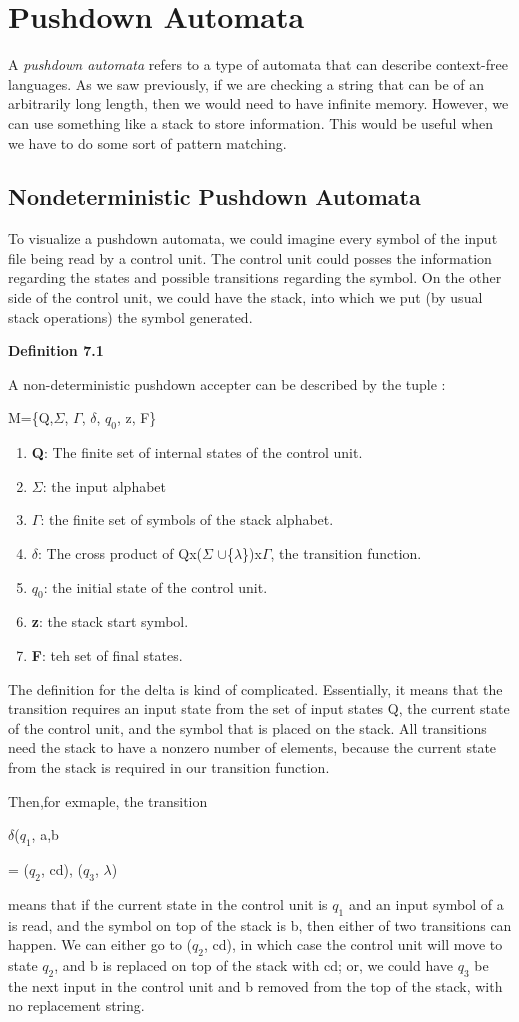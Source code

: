 \documentclass{article}
\begin{document}
\section{Pushdown Automata}
A \textit{pushdown automata} refers to a type of automata that can describe context-free languages. As we saw previously, if we 
are checking a string that can be of an arbitrarily long length, then we would need to have infinite memory. However, we can use 
something like a stack to store information. This would be useful when we have to do some sort of pattern matching.
\subsection{Nondeterministic Pushdown Automata}
To visualize a pushdown automata, we could imagine every symbol of the input file being read by a control unit. The control 
unit could posses the information regarding the states and possible transitions regarding the symbol. On the other side of the
control unit, we could have the stack, into which we put (by usual stack operations) the symbol generated.

\centerline{\textbf{Definition 7.1}}

A non-deterministic pushdown accepter can be described by the tuple :

\centerline{M=\{Q,$\Sigma$, $\Gamma$, $\delta$, $q_0$, z, F\}}

\begin{enumerate}
		\item{\textbf{Q}}: The finite set of internal states of the control unit.
		\item{\textbf{$\Sigma$}}: the input alphabet
		\item{\textbf{$\Gamma$}}: the finite set of symbols of the stack alphabet. 
		\item{\textbf{$\delta$}}: The cross product of Qx($\Sigma$ $\cup$\{$\lambda$\})x$\Gamma$, the transition function.
		\item{\textbf{$q_0$}}: the initial state of the control unit.
		\item{\textbf{z}}: the stack start symbol.
		\item{\textbf{F}}: teh set of final states.
\end{enumerate}
The definition for the delta is kind of complicated. Essentially, it means  that the transition requires an input state from
the set of input states Q, the current state of the control unit, and the symbol that is placed on the stack. All transitions need
the stack to have a nonzero number of elements, because the current state from the stack is required in our transition function.

Then,for exmaple, the transition

\centerline{$\delta$($q_1$, a,b}= {($q_2$, cd), ($q_3$, $\lambda$)}

means that if the current state in the control unit is $q_1$ and an input symbol of a is read, and the symbol on top of the stack
is b, then either of two transitions can happen. We can either go to ($q_2$, cd), in which case the control unit will move to 
state $q_2$, and b is replaced on top of the stack with cd; or, we could have $q_3$ be the next input in the control unit and b
removed from the top of the stack, with no replacement string.
\end{document}
